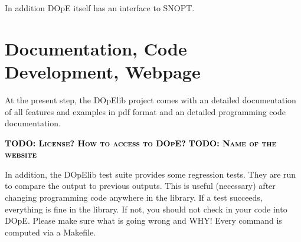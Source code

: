 \documentclass[prodmode,acmtoms]{acmsmall}
\numberwithin{equation}{section}
\newcommand{\todo}[1]{\textbf{\textsc{\textcolor{black}{TODO: #1}}}}
\begin{document}
In addition DOpE itself has an interface to SNOPT.

\section{Documentation, Code Development, Webpage}
\label{documentation}
At the present step, the DOpElib project comes with 
an detailed documentation of all features and examples 
in pdf format and an detailed programming code 
documentation. 

\todo{License? How to access to DOpE?}
\todo{Name of the website}

In addition, the DOpElib test suite provides some regression tests. 
They are run to compare 
the output to previous outputs. This is useful (necessary) after 
changing programming code anywhere in the library. If a test
succeeds, everything is fine in the library. If not, you should not
check in your code into DOpE. Please make sure what is going wrong and WHY!
Every command is computed via a Makefile. 



\end{document}
